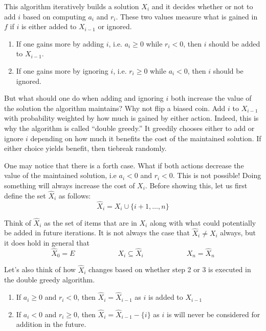 \documentclass{article}
\begin{document}
This algorithm iteratively builds a solution $X_i$ and it decides whether or not to add $i$ based on computing $a_{i}$ and $r_{i}$. These two values measure what is gained in $f$ if $i$ is either added to $X_{i-1}$ or ignored.
\vspace{-1em}
\begin{enumerate}[-]
\item If one gains more by adding $i$, i.e. $a_i \geq 0$ while $r_i < 0$, then $i$ should be added to $X_{i-1}$.

\item If one gains more by ignoring $i$, i.e. $r_i \geq 0$ while $a_i < 0$, then $i$ should be ignored.
\end{enumerate}

But what should one do when adding and ignoring $i$ both increase the value of the solution the algorithm maintains? Why not flip a biased coin. Add $i$ to $X_{i-1}$ with probability weighted by how much is gained by either action. Indeed, this is why the algorithm is called ``double greedy.'' It greedily chooses either to add or ignore $i$ depending on how much it benefits the cost of the maintained solution. If either choice yields benefit, then tiebreak randomly.

One may notice that there is a forth case. What if both actions decrease the value of the maintained solution, i.e $a_i < 0$ and $r_i < 0$. This is not possible! Doing something will always increase the cost of $X_i$. Before showing this, let us first define the set $\hat{X}_i$ as follows:
\begin{equation*}
\hat{X}_i = X_i \cup \{ i+1, \ldots, n \}
\end{equation*}

Think of $\hat{X}_i$ as the set of items that are in $X_i$ along with what could potentially be added in future iterations. It is not always the case that $\hat{X}_i \neq X_i$ always, but it does hold in general that
\begin{equation*}
\hat{X}_0 = E
\qquad\qquad\qquad
X_i \subseteq \hat{X}_i
\qquad\qquad\qquad
X_n = \hat{X}_n
\end{equation*}

Let's also think of how $\hat{X}_i$ changes based on whether step 2 or 3 is executed in the double greedy algorithm.
\vspace{-1em}
\begin{enumerate}[-]
\item If $a_i \geq 0$ and $r_i < 0$, then $\hat{X}_i = \hat{X}_{i-1}$ as $i$ is added to $X_{i-1}$

\item If $a_i < 0$ and $r_i \geq 0$, then $\hat{X}_i = \hat{X}_{i-1} - \{ i \}$ as $i$ is will never be considered for addition in the future.
\end{enumerate}
\end{document}
